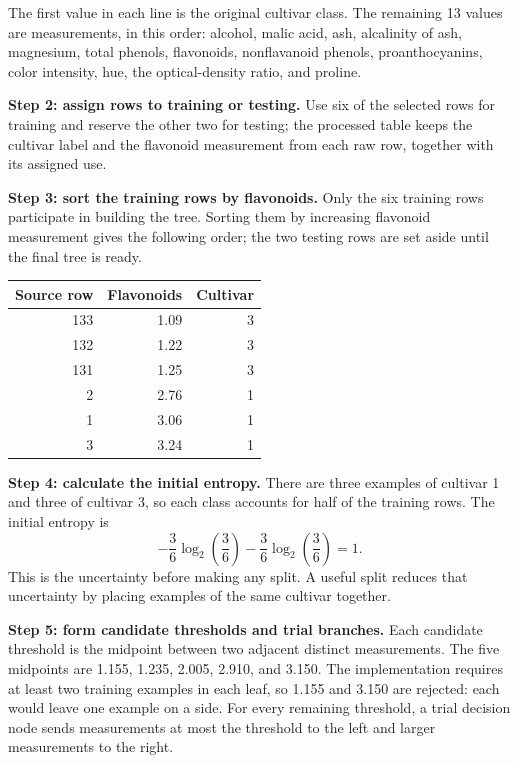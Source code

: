 \documentclass[11pt,letterpaper]{article}
\begin{document}
The first value in each line is the original cultivar class. The remaining
13 values are measurements, in this order: alcohol, malic acid, ash,
alcalinity of ash, magnesium, total phenols, flavonoids, nonflavanoid phenols,
proanthocyanins, color intensity, hue, the optical-density ratio, and proline.

\textbf{Step 2: assign rows to training or testing.}
Use six of the selected rows for training and reserve the other two for testing;
the processed table keeps the cultivar label and the flavonoid measurement
from each raw row, together with its assigned use.

\begin{table}[!ht]\centering\small

\caption{Processed data for the worked example: one numeric predictor, its
original class label, and the row's assigned use.}
\label{tab:realrows}
\end{table}

\textbf{Step 3: sort the training rows by flavonoids.}
Only the six training rows participate in building the tree. Sorting them
by increasing flavonoid measurement gives the following order; the two testing
rows are set aside until the final tree is ready.

\begin{center}\small
\begin{tabular}{@{}rrr@{}}\toprule
Source row & Flavonoids & Cultivar\\\midrule
133 & 1.09 & 3\\
132 & 1.22 & 3\\
131 & 1.25 & 3\\
2 & 2.76 & 1\\
1 & 3.06 & 1\\
3 & 3.24 & 1\\
\bottomrule\end{tabular}
\end{center}

\textbf{Step 4: calculate the initial entropy.}
There are three examples of cultivar 1 and three of cultivar 3, so each
class accounts for half of the training rows. The initial entropy is
\[
-\frac{3}{6}\log_2\!\left(\frac{3}{6}\right)
-\frac{3}{6}\log_2\!\left(\frac{3}{6}\right)=1.
\]
This is the uncertainty before making any split. A useful split reduces that
uncertainty by placing examples of the same cultivar together.

\textbf{Step 5: form candidate thresholds and trial branches.}
Each candidate threshold is the midpoint between two adjacent distinct
measurements. The five midpoints are 1.155, 1.235, 2.005, 2.910, and 3.150.
The implementation requires at least two training examples in each leaf,
so 1.155 and 3.150 are rejected: each would leave one example on a side.
For every remaining threshold, a trial decision node sends measurements
at most the threshold to the left and larger measurements to the right.
\end{document}
